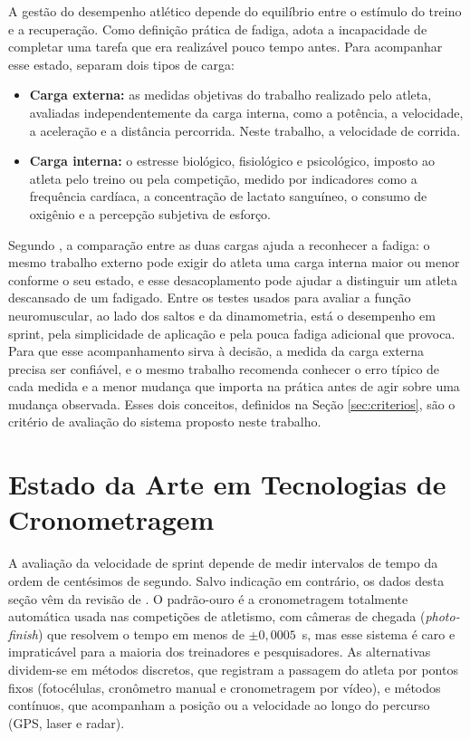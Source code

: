 \documentclass[
    12pt,               %
    openright,          %
    twoside,            %
    a4paper,            %
    chapter=TITLE,      %
    english,            %
    brazil              %
    ]{abntex2}
\begin{document}
A gestão do desempenho atlético depende do equilíbrio entre o estímulo do treino e a recuperação. Como definição prática de fadiga,  adota a incapacidade de completar uma tarefa que era realizável pouco tempo antes. Para acompanhar esse estado,  separam dois tipos de carga:
\begin{itemize}
    \item \textbf{Carga externa:} as medidas objetivas do trabalho realizado pelo atleta, avaliadas independentemente da carga interna, como a potência, a velocidade, a aceleração e a distância percorrida. Neste trabalho, a velocidade de corrida.
    \item \textbf{Carga interna:} o estresse biológico, fisiológico e psicológico, imposto ao atleta pelo treino ou pela competição, medido por indicadores como a frequência cardíaca, a concentração de lactato sanguíneo, o consumo de oxigênio e a percepção subjetiva de esforço.
\end{itemize}

Segundo , a comparação entre as duas cargas ajuda a reconhecer a fadiga: o mesmo trabalho externo pode exigir do atleta uma carga interna maior ou menor conforme o seu estado, e esse desacoplamento pode ajudar a distinguir um atleta descansado de um fadigado. Entre os testes usados para avaliar a função neuromuscular, ao lado dos saltos e da dinamometria, está o desempenho em sprint, pela simplicidade de aplicação e pela pouca fadiga adicional que provoca. Para que esse acompanhamento sirva à decisão, a medida da carga externa precisa ser confiável, e o mesmo trabalho recomenda conhecer o erro típico de cada medida e a menor mudança que importa na prática antes de agir sobre uma mudança observada. Esses dois conceitos, definidos na Seção \ref{sec:criterios}, são o critério de avaliação do sistema proposto neste trabalho.

\section{Estado da Arte em Tecnologias de Cronometragem}

A avaliação da velocidade de sprint depende de medir intervalos de tempo da ordem de centésimos de segundo. Salvo indicação em contrário, os dados desta seção vêm da revisão de . O padrão-ouro é a cronometragem totalmente automática usada nas competições de atletismo, com câmeras de chegada (\textit{photo-finish}) que resolvem o tempo em menos de $\pm 0{,}0005$~s, mas esse sistema é caro e impraticável para a maioria dos treinadores e pesquisadores. As alternativas dividem-se em métodos discretos, que registram a passagem do atleta por pontos fixos (fotocélulas, cronômetro manual e cronometragem por vídeo), e métodos contínuos, que acompanham a posição ou a velocidade ao longo do percurso (GPS, laser e radar).
\end{document}
